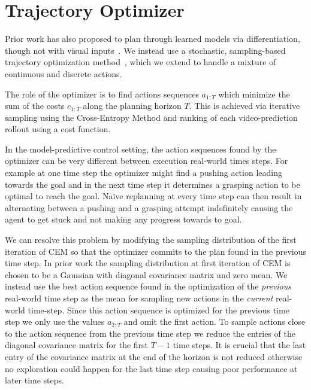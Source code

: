 \section{Trajectory Optimizer}
\label{sec:optimizer}

Prior work has also proposed to plan through learned models via differentiation, though not with visual inputs~\cite{deep_mpc}. We instead use a stochastic, sampling-based trajectory optimization method~\cite{cem-rk-13,foresight}, which we extend to handle a mixture of continuous and discrete actions.

The role of the optimizer is to find actions sequences $a_{1:T}$ which minimize the sum of the costs $c_{1:T}$ along the planning horizon $T$. This is achieved via iterative sampling using the Cross-Entropy Method
and ranking of each video-prediction rollout using a cost function. 

In the model-predictive control setting, the action sequences found by the optimizer can be very different between execution real-world times steps. For example at one time step the optimizer might find a pushing action leading towards the goal and in the next time step it determines a grasping action to be optimal to reach the goal. Na\"{i}ve replanning at every time step can then result in alternating between a pushing and a grasping attempt indefinitely causing the agent to get stuck and not making any progress towards to goal. 

We can resolve this problem by modifying the sampling distribution of the first iteration of CEM so that the optimizer commits to the plan found in the previous time step. In prior work \cite{sna}
the sampling distribution at first iteration of CEM is chosen to be a Gaussian with diagonal covariance matrix and zero mean. We instead use the best action sequence found in the optimization of the \emph{previous} real-world time step as the mean for sampling new actions in the \emph{current} real-world time-step. Since this action sequence is optimized for the previous time step we only use the values $a_{2:T}$ and omit the first action. To sample actions close to the action sequence from the previous time step we reduce the entries of the diagonal covariance matrix for the first $T-1$ time steps. It is crucial that the last entry of the covariance matrix at the end of the horizon is not reduced otherwise no exploration could happen for the last time step causing poor performance at later time steps.